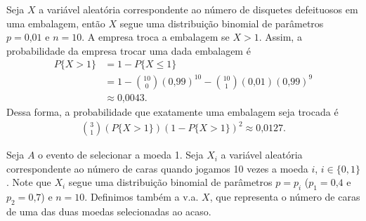\begin{questions}
\setcounter{question}{47}
\begin{solution}
	Seja $X$ a variável aleatória correspondente ao número de disquetes defeituosos em uma embalagem, então $X$ segue uma distribuição binomial de parâmetros $p=\text{0,01}$ e $n=10$. A empresa troca a embalagem se $X>1$. Assim, a probabilidade da empresa trocar uma dada embalagem é
    \begin{align*}
    	P\{X > 1\} &= 1 - P\{X\le 1\} \\
        	&= 1 - \binom{10}{0}(\text{0,99})^{10}
            	- \binom{10}{1}(\text{0,01})(\text{0,99})^9 \\
			&\approx \text{0,0043}.
    \end{align*}
    Dessa forma, a probabilidade que exatamente uma embalagem seja trocada é
    \begin{align*}
		\binom{3}{1}(P\{X > 1\})(1-P\{X > 1\})^2 \approx \text{0,0127}.
    \end{align*}
\end{solution}

\begin{solution}
	Seja $A$ o evento de selecionar a moeda 1. Seja $X_i$ a variável aleatória correspondente ao número de caras quando jogamos 10 vezes a moeda $i$, $i\in\{0,1\}$. Note que $X_i$ segue uma distribuição binomial de parâmetros $p=p_i$ ($p_1=\text{0,4}$ e $p_2=\text{0,7}$) e $n=10$. Definimos também a v.a. $X$, que representa o número de caras de uma das duas moedas selecionadas ao acaso.
\begin{parts}

\end{parts}
\end{solution}
\end{questions}
